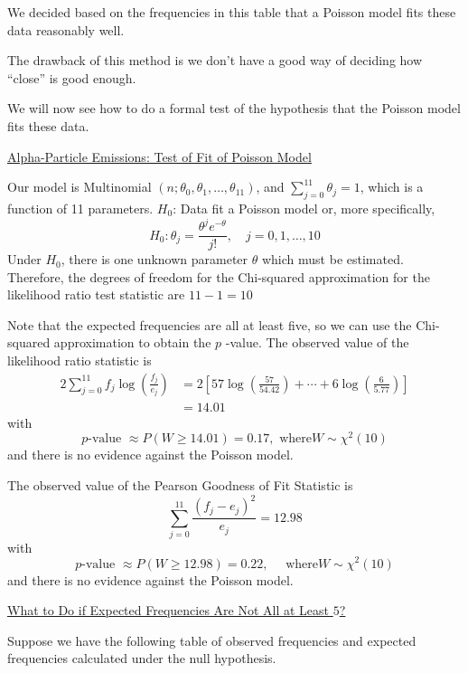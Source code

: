 \documentclass[oneside]{book}
\begin{document}
We decided based on the frequencies in this table that a Poisson model fits these data
reasonably well.

The drawback of this method is we don't have a good way of deciding how ``close'' is good enough.

We will now see how to do a formal test of the hypothesis that the Poisson model fits these data.

\underline{Alpha-Particle Emissions: Test of Fit of Poisson Model}

Our model is Multinomial $\left(n ; \theta_{0}, \theta_{1}, \ldots, \theta_{11}\right)$, and $\sum_{j=0}^{11} \theta_{j}=1$, which is a function of 11 parameters.
$H_{0}$: Data fit a Poisson model or, more specifically,
\[
    H_{0}: \theta_{j}=\frac{\theta^{j} e^{-\theta}}{j !}, \quad j=0,1, \ldots, 10
\]
Under $H_{0}$, there is one unknown parameter $\theta$ which must be estimated.
Therefore, the degrees of freedom for the Chi-squared approximation for the likelihood ratio test statistic are $11-1=10$

Note that the expected frequencies are all at least five, so we can use the Chi-squared approximation to obtain the $p$ -value.
The observed value of the likelihood ratio statistic is
\[
    \begin{aligned}
        2 \sum_{j=0}^{11} f_{j} \log \left(\frac{f_{j}}{e_{j}}\right) & =2\left[57 \log \left(\frac{57}{54.42}\right)+\cdots+6 \log \left(\frac{6}{5.77}\right)\right] \\
                                                                      & =14.01
    \end{aligned}
\]
with
\[
    p \text{-value } \approx P(W \geq 14.01)=0.17, \text{ where} W \sim \chi^{2}(10)
\]
and there is no evidence against the Poisson model.

The observed value of the Pearson Goodness of Fit Statistic is
\[
    \sum_{j=0}^{11} \frac{\left(f_{j}-e_{j}\right)^{2}}{e_{j}}=12.98
\]
with
\[
    p \text{-value } \approx P(W \geq 12.98)=0.22, \quad \text{ where} W \sim \chi^{2}(10)
\]
and there is no evidence against the Poisson model.

\underline{What to Do if Expected Frequencies Are Not All at Least $ 5 $?}

Suppose we have the following table of observed frequencies and expected frequencies calculated
under the null hypothesis.
\end{document}
